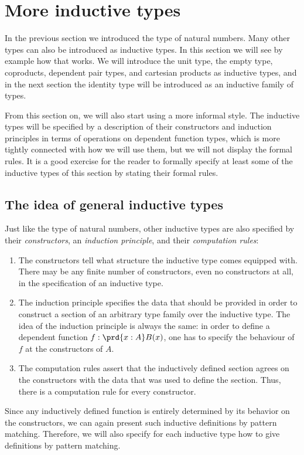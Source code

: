 \section{More inductive types}\label{sec:inductive}

In the previous section we introduced the type of natural numbers. Many other types can also be introduced as inductive types. In this section we will see by example how that works. We will introduce the unit type, the empty type, coproducts, dependent pair types, and cartesian products as inductive types, and in the next section the identity type will be introduced as an inductive family of types.

From this section on, we will also start using a more informal style. The inductive types will be specified by a description of their constructors and induction principles in terms of operations on dependent function types, which is more tightly connected with how we will use them, but we will not display the formal rules. It is a good exercise for the reader to formally specify at least some of the inductive types of this section by stating their formal rules.

\subsection{The idea of general inductive types}

Just like the type of natural numbers, other inductive types are also specified by their \emph{constructors}, an \emph{induction principle}, and their \emph{computation rules}: 
\begin{enumerate}
\item The constructors tell what structure the inductive type comes equipped with. There may be any finite number of constructors, even no constructors at all, in the specification of an inductive type. 
\item The induction principle specifies the data that should be provided in order to construct a section of an arbitrary type family over the inductive type. The idea of the induction principle is always the same: in order to define a dependent function $f:\prd{x:A}B(x)$, one has to specify the behaviour of $f$ at the constructors of $A$.
\item The computation rules assert that the inductively defined section agrees on the constructors with the data that was used to define the section. Thus, there is a computation rule for every constructor.
\end{enumerate}
Since any inductively defined function is entirely determined by its behavior on the constructors, we can again present such inductive definitions by pattern matching. Therefore, we will also specify for each inductive type how to give definitions by pattern matching.

